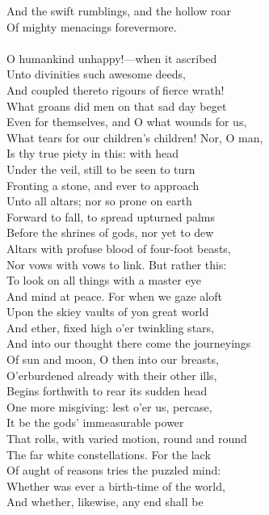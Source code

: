 And the swift rumblings, and the hollow roar\\
Of mighty menacings forevermore.\\
\\
O humankind unhappy!—when it ascribed\\
Unto divinities such awesome deeds,\\
And coupled thereto rigours of fierce wrath!\\
What groans did men on that sad day beget\\
Even for themselves, and O what wounds for us,\\
What tears for our children's children! Nor, O man,\\
Is thy true piety in this: with head\\
Under the veil, still to be seen to turn\\
Fronting a stone, and ever to approach\\
Unto all altars; nor so prone on earth\\
Forward to fall, to spread upturned palms\\
Before the shrines of gods, nor yet to dew\\
Altars with profuse blood of four-foot beasts,\\
Nor vows with vows to link. But rather this:\\
To look on all things with a master eye\\
And mind at peace. For when we gaze aloft\\
Upon the skiey vaults of yon great world\\
And ether, fixed high o'er twinkling stars,\\
And into our thought there come the journeyings\\
Of sun and moon, O then into our breasts,\\
O'erburdened already with their other ills,\\
Begins forthwith to rear its sudden head\\
One more misgiving: lest o'er us, percase,\\
It be the gods' immeasurable power\\
That rolls, with varied motion, round and round\\
The far white constellations. For the lack\\
Of aught of reasons tries the puzzled mind:\\
Whether was ever a birth-time of the world,\\
And whether, likewise, any end shall be\\
